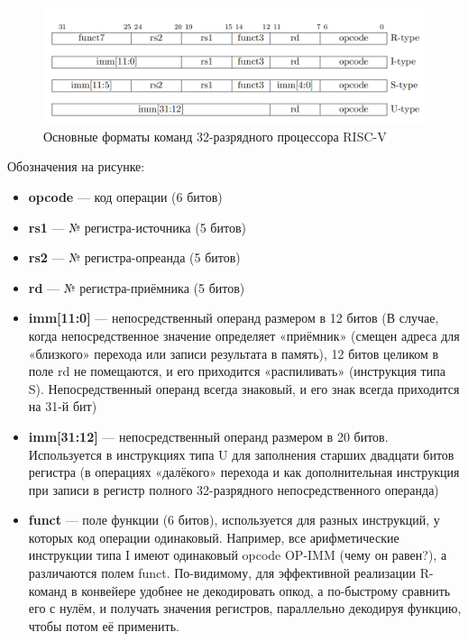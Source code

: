 \begin{figure}[htbp]
    \centering
    \includegraphics[width=1.0\textwidth]{img/RISCV_4_Commands.png}
    \caption{Основные форматы команд 32-разрядного процессора RISC-V}
    \label{command-01}
\end{figure}
Обозначения на рисунке:
\begin{itemize}
    \item \textbf{opcode} — код операции (6 битов)
    \item \textbf{rs1} --- № регистра-источника (5 битов)
    \item \textbf{rs2} --- № регистра-опреанда (5 битов)
    \item \textbf{rd} --- № регистра-приёмника (5 битов)
    \item \textbf{imm[11:0]} --- непосредственный операнд размером в 12 битов (В случае, когда непосредственное значение определяет «приёмник» (смещен адреса для «близкого» перехода или записи результата в память), 12 битов целиком в поле rd не помещаются, и его приходится «распиливать» (инструкция типа S). Непосредственный операнд всегда знаковый, и его знак всегда приходится на 31-й бит)
    \item \textbf{imm[31:12]} --- непосредственный операнд размером в 20 битов. Используется в инструкциях типа U для заполнения старших двадцати битов регистра (в операциях «далёкого» перехода и как дополнительная инструкция при записи в регистр полного 32-разрядного непосредственного операнда)
    \item \textbf{funct} --- поле функции (6 битов), используется для разных инструкций, у которых код операции одинаковый. Например, все арифметические инструкции типа I имеют одинаковый opcode OP-IMM (чему он равен?), а различаются полем funct. По-видимому, для эффективной реализации R-команд в конвейере удобнее не декодировать опкод, а по-быстрому сравнить его с нулём, и получать значения регистров, параллельно декодируя функцию, чтобы потом её применить.
\end{itemize}


